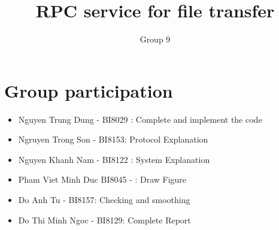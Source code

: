 \documentclass{article}
\author{Group 9}
\title{RPC service for file transfer}
\begin{document}
\maketitle
\section{Group participation}
\begin{itemize}
\item Nguyen Trung Dung - BI8029 : Complete and implement the code
\item Ngruyen Trong Son - BI8153: Protocol Explanation
\item Nguyen Khanh Nam - BI8122 : System Explanation
\item Pham Viet Minh Duc BI8045 - : Draw Figure
\item Do Anh Tu - BI8157: Checking and smoothing 
\item Do Thi Minh Ngoc - BI8129: Complete Report
\end{itemize}
\end{document}
